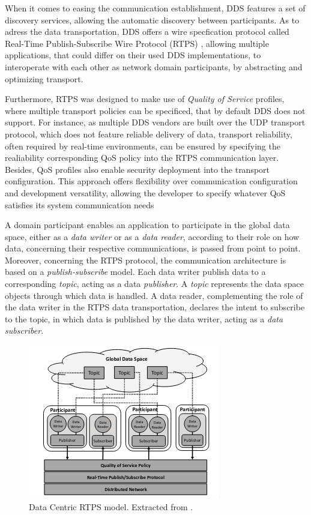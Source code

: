 When it comes to easing the communication establishment, DDS features a set of discovery services, allowing the automatic discovery between participants. As to adress the data transportation, DDS offers a wire specfication protocol called Real-Time Publish-Subscribe Wire Protocol (RTPS) \cite{rtps}, allowing multiple applications, that could differ on their used DDS implementations, to interoperate with each other as network domain participants, by abstracting and optimizing transport. 

Furthermore, RTPS was designed to make use of \textit{Quality of Service} profiles, where multiple transport policies can be specificed, that by default DDS does not support. For instance, as multiple DDS vendors are built over the UDP \cite{udp} transport protocol, which does not feature reliable delivery of data, transport reliability, often required by real-time environments, can be ensured by specifying the realiability corresponding QoS policy into the RTPS communication layer. Besides, QoS profiles also enable security deployment into the transport configuration. This approach offers flexibility over communication configuration and development versatility, allowing the developer to specify whatever QoS satisfies its system communication needs

A domain participant enables an application to participate in the global data space, either as a \textit{data writer} or as a \textit{data reader}, according to their role on how data, concerning their respective communications, is passed from point to point. Moreover, concerning the RTPS protocol, the communication architecture is based on a \textit{publish-subscribe} model. Each data writer publish data to a corresponding \textit{topic}, acting as a data \textit{publisher}. A \textit{topic} represents the data space objects through which data is handled. A data reader, complementing the role of the data writer in the RTPS data transportation, declares the intent to subscribe to the topic, in which data is published by the data writer, acting as a \textit{data subscriber}. 

\begin{figure}[H]
    \centering
    \includegraphics[width=0.5\linewidth]{images/dcps-model.png}
    \caption{Data Centric RTPS model. Extracted from \cite{maruyama2016exploring}.}
    \label{fig:dcps-model}
\end{figure}

